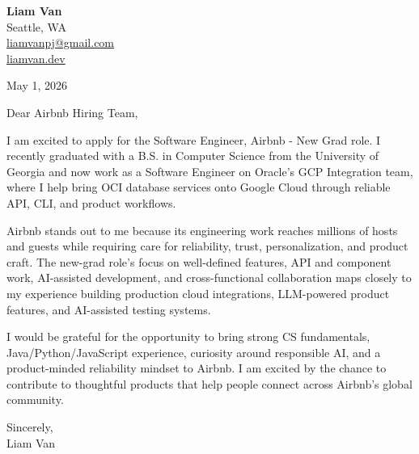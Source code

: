 \documentclass[letterpaper,11pt]{article}
\begin{document}
\begin{flushleft}
\textbf{\Large Liam Van} \\
Seattle, WA \\
\href{mailto:liamvanpj@gmail.com}{liamvanpj@gmail.com} \\
\href{https://liamvan.dev}{liamvan.dev}
\end{flushleft}

May 1, 2026

\noindent Dear Airbnb Hiring Team,

\noindent I am excited to apply for the Software Engineer, Airbnb - New Grad role. I recently graduated with a B.S. in Computer Science from the University of Georgia and now work as a Software Engineer on Oracle's GCP Integration team, where I help bring OCI database services onto Google Cloud through reliable API, CLI, and product workflows.

\noindent Airbnb stands out to me because its engineering work reaches millions of hosts and guests while requiring care for reliability, trust, personalization, and product craft. The new-grad role's focus on well-defined features, API and component work, AI-assisted development, and cross-functional collaboration maps closely to my experience building production cloud integrations, LLM-powered product features, and AI-assisted testing systems.

\noindent I would be grateful for the opportunity to bring strong CS fundamentals, Java/Python/JavaScript experience, curiosity around responsible AI, and a product-minded reliability mindset to Airbnb. I am excited by the chance to contribute to thoughtful products that help people connect across Airbnb's global community.

\noindent Sincerely, \\
Liam Van
\end{document}
